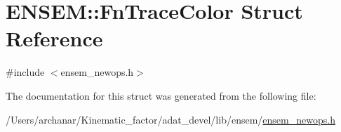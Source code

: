 \hypertarget{structENSEM_1_1FnTraceColor}{}\section{E\+N\+S\+EM\+:\+:Fn\+Trace\+Color Struct Reference}
\label{structENSEM_1_1FnTraceColor}


{\ttfamily \#include $<$ensem\+\_\+newops.\+h$>$}



The documentation for this struct was generated from the following file\+:\begin{DoxyCompactItemize}
\item 
/\+Users/archanar/\+Kinematic\+\_\+factor/adat\+\_\+devel/lib/ensem/\mbox{\hyperlink{lib_2ensem_2ensem__newops_8h}{ensem\+\_\+newops.\+h}}\end{DoxyCompactItemize}
